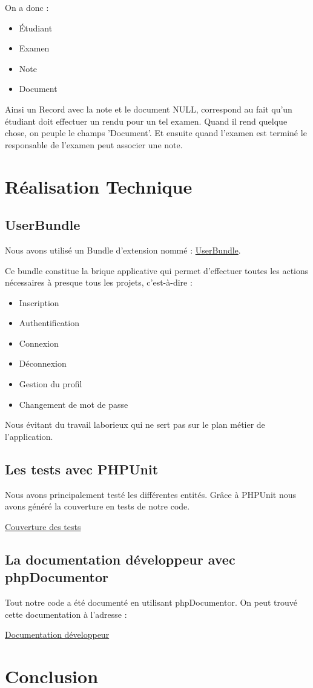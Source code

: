 \documentclass{report}
\begin{document}
			On a donc :
			\begin{itemize}
				\item{Étudiant}
				\item{Examen}
				\item{Note}
				\item{Document}
			\end{itemize}

			Ainsi un Record avec la note et le document NULL, correspond au fait qu'un étudiant doit
			effectuer un rendu pour un tel examen. Quand il rend quelque chose, on peuple le champs
			'Document'. Et ensuite quand l'examen est terminé le responsable de l'examen peut associer 
			une note.


  \section{Réalisation Technique}
    \subsection{UserBundle}
      Nous avons utilisé un Bundle d'extension nommé : 
      \href{https://github.com/FriendsOfSymfony/FOSUserBundle}{UserBundle}.
      
      Ce bundle constitue la brique applicative qui permet d'effectuer toutes
      les actions nécessaires à presque tous les projets, c'est-à-dire :
      \begin{itemize}
        \item{Inscription}
        \item{Authentification}
        \item{Connexion}
        \item{Déconnexion}
        \item{Gestion du profil}
        \item{Changement de mot de passe}
      \end{itemize}
      Nous évitant du travail laborieux qui ne sert pas sur le plan métier de
      l'application.

    \subsection{Les tests avec PHPUnit}
			Nous avons principalement testé les différentes entités. Grâce à PHPUnit nous
			avons généré la couverture en tests de notre code.

			\href{http://ares-ensiie.eu/~unbekandt2011/UnsapaIPW/cov}{Couverture des tests}
    \subsection{La documentation développeur avec phpDocumentor}
			Tout notre code a été documenté en utilisant phpDocumentor. On peut trouvé cette
			documentation à l'adresse :

			\href{http://ares-ensiie.eu/~unbekandt2011/UnsapaIPW/doc}{Documentation développeur}

  \section*{Conclusion}
\end{document}

